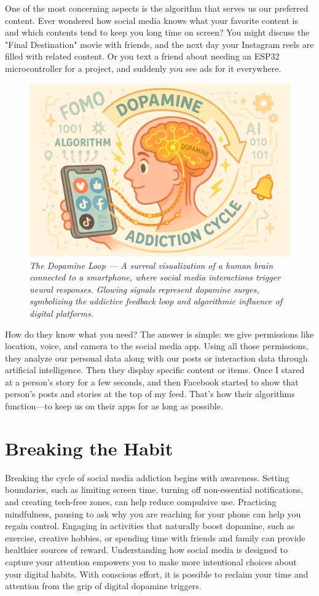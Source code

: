 \documentclass[a4paper,10pt,twocolumn]{memoir}
\begin{document}
One of the most concerning aspects is the algorithm that serves us our preferred content. Ever wondered how social media knows what your favorite content is and which contents tend to keep you long time on screen? You might discuss the "Final Destination" movie with friends, and the next day your Instagram reels are filled with related content. Or you text a friend about needing an ESP32 microcontroller for a project, and suddenly you see ads for it everywhere.

\begin{figure}[h!]
  \centering
  \includegraphics[width=0.9\linewidth]{brended.png}
  \caption*{\textit{The Dopamine Loop — A surreal visualization of a human brain connected to a smartphone, where social media interactions trigger neural responses. Glowing signals represent dopamine surges, symbolizing the addictive feedback loop and algorithmic influence of digital platforms.}}
\end{figure}

How do they know what you need? The answer is simple: we give permissions like location, voice, and camera to the social media app. Using all those permissions, they analyze our personal data along with our posts or interaction data through artificial intelligence. Then they display specific content or items. Once I stared at a person’s story for a few seconds, and then Facebook started to show that person’s posts and stories at the top of my feed. That’s how their algorithms function—to keep us on their apps for as long as possible.

\section*{Breaking the Habit}

Breaking the cycle of social media addiction begins with awareness. Setting boundaries, such as limiting screen time, turning off non-essential notifications, and creating tech-free zones, can help reduce compulsive use. Practicing mindfulness, pausing to ask why you are reaching for your phone can help you regain control. Engaging in activities that naturally boost dopamine, such as exercise, creative hobbies, or spending time with friends and family can provide healthier sources of reward. Understanding how social media is designed to capture your attention empowers you to make more intentional choices about your digital habits. With conscious effort, it is possible to reclaim your time and attention from the grip of digital dopamine triggers.
\end{document}
